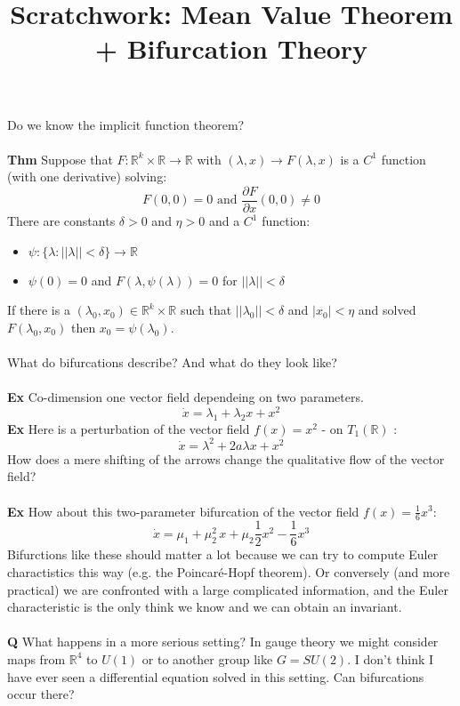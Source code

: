 \documentclass[12pt]{article}
\title{Scratchwork: Mean Value Theorem + Bifurcation Theory}
\date{}
\begin{document}
\sffamily

\maketitle

\noindent Do we know the implicit function theorem? \\ \\
\textbf{Thm} Suppose that $F: \mathbb{R}^k \times \mathbb{R} \to \mathbb{R}$ with $(\lambda, x) \to F(\lambda,x)$ is a $C^1$ function (with one derivative) solving:
$$ F(0,0) = 0 \text{ and }\frac{\partial F}{\partial x}(0,0) \neq 0 $$
There are constants $\delta > 0$ and $\eta > 0$ and a $C^1$ function:
\begin{itemize}
\item $\psi: \{ \lambda: ||\lambda|| < \delta \} \to \mathbb{R}$
\item $\psi(0) = 0$ and $F(\lambda, \psi(\lambda)) = 0$ for $||\lambda|| < \delta$
\end{itemize}
If there is a $(\lambda_0, x_0) \in \mathbb{R}^k \times \mathbb{R}$ such that $||\lambda_0|| < \delta$ and $|x_0| < \eta$ and solved $F(\lambda_0, x_0)$ then $x_0 = \psi(\lambda_0)$. \\ \\
What do bifurcations describe? And what do they look like? \\ \\
\textbf{Ex} Co-dimension one vector field dependeing on two parameters.
$$ \dot{x} = \lambda_1 + \lambda_2 x + x^2 $$
\textbf{Ex} Here is a perturbation of the vector field $f(x) = x^2$ - on $T_1(\mathbb{R})$ :
$$ \dot{x} = \lambda^2 + 2a\lambda x + x^2 $$
How does a mere shifting of the arrows change the qualitative flow of the vector field? \\ \\
\textbf{Ex} How about this two-parameter bifurcation of the vector field $f(x) = \frac{1}{6}x^3$:
$$ \dot{x} = \mu_1 + \mu_2^2 \, x + \mu_2 \frac{1}{2}x^2 - \frac{1}{6}x^3 $$
Bifurctions like these should matter a lot because we can try to compute Euler charactistics this way (e.g. the Poincar\'{e}-Hopf theorem).  Or conversely (and more practical) we are confronted with a large complicated information, and the Euler characteristic is the only think we know and we can obtain an invariant.\\ \\
\textbf{Q} What happens in a more serious setting? In gauge theory we might consider maps from $\mathbb{R}^4$ to $U(1)$ or to another group like $G = SU(2)$.  I don't think I have ever seen a differential equation solved in this setting.  Can bifurcations occur there? \\ \\
\end{document}
